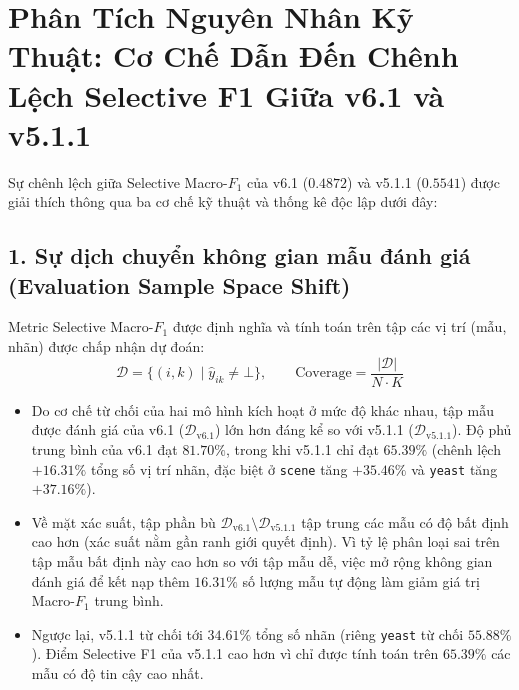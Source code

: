 \documentclass[11pt,a4paper]{article}
\begin{document}
\section{Phân Tích Nguyên Nhân Kỹ Thuật: Cơ Chế Dẫn Đến Chênh Lệch Selective F1 Giữa v6.1 và v5.1.1}

Sự chênh lệch giữa Selective Macro-$F_1$ của v6.1 ($0.4872$) và v5.1.1 ($0.5541$) được giải thích thông qua ba cơ chế kỹ thuật và thống kê độc lập dưới đây:

\subsection{1. Sự dịch chuyển không gian mẫu đánh giá (Evaluation Sample Space Shift)}
Metric Selective Macro-$F_1$ được định nghĩa và tính toán trên tập các vị trí (mẫu, nhãn) được chấp nhận dự đoán:
\begin{equation}
\mathcal{D} = \{ (i, k) \mid \hat{y}_{ik} \ne \bot \}, \qquad \text{Coverage} = \frac{|\mathcal{D}|}{N \cdot K}
\end{equation}
\begin{itemize}
    \item Do cơ chế từ chối của hai mô hình kích hoạt ở mức độ khác nhau, tập mẫu được đánh giá của v6.1 ($\mathcal{D}_{\text{v6.1}}$) lớn hơn đáng kể so với v5.1.1 ($\mathcal{D}_{\text{v5.1.1}}$). Độ phủ trung bình của v6.1 đạt $81.70\%$, trong khi v5.1.1 chỉ đạt $65.39\%$ (chênh lệch $+16.31\%$ tổng số vị trí nhãn, đặc biệt ở \texttt{scene} tăng $+35.46\%$ và \texttt{yeast} tăng $+37.16\%$).
    \item Về mặt xác suất, tập phần bù $\mathcal{D}_{\text{v6.1}} \setminus \mathcal{D}_{\text{v5.1.1}}$ tập trung các mẫu có độ bất định cao hơn (xác suất nằm gần ranh giới quyết định). Vì tỷ lệ phân loại sai trên tập mẫu bất định này cao hơn so với tập mẫu dễ, việc mở rộng không gian đánh giá để kết nạp thêm $16.31\%$ số lượng mẫu tự động làm giảm giá trị Macro-$F_1$ trung bình.
    \item Ngược lại, v5.1.1 từ chối tới $34.61\%$ tổng số nhãn (riêng \texttt{yeast} từ chối $55.88\%$). Điểm Selective F1 của v5.1.1 cao hơn vì chỉ được tính toán trên $65.39\%$ các mẫu có độ tin cậy cao nhất.
\end{itemize}
\end{document}
